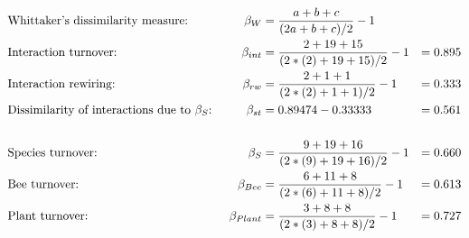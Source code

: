 \documentclass[11pt]{article}
\begin{document}
\begin{align*}
	& \textnormal{Whittaker's dissimilarity measure: } & \beta_{W} & = \frac{a + b + c}{(2a + b + c)/2} - 1 \\
	 &\textnormal{Interaction turnover: } & \beta_{int} & = \frac{2 + 19 + 15}{(2*(2) + 19 + 15)/2} - 1 & = 0.895\\
	 &\textnormal{Interaction rewiring: } & \beta_{rw} & = \frac{2 + 1 + 1}{(2*(2) + 1 + 1)/2} - 1 & = 0.333\\
	 &\textnormal{Dissimilarity of interactions due to $\beta_{S}$: } & \beta_{st} & = 0.89474 - 0.33333 & = 0.561 \\
	 \\
	 &\textnormal{Species turnover: } & \beta_{S} & = \frac{9 + 19 + 16}{(2*(9) + 19 + 16)/2} - 1 & = 0.660\\
	 &\textnormal{Bee turnover: } & \beta_{Bee} & = \frac{6 + 11 + 8}{(2*(6) + 11 + 8)/2} - 1 & = 0.613\\
	 &\textnormal{Plant turnover: } & \beta_{Plant} & = \frac{3 + 8 + 8}{(2*(3) + 8 + 8)/2} - 1 & = 0.727\\
\end{align*}
\end{document}
